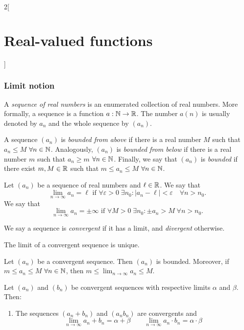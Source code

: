 \documentclass[../../../main.tex]{subfiles}
\begin{document}
\begin{multicols}{2}[\section{Real-valued functions}]
    \subsubsection*{Limit notion}
    \begin{definition}
        A \textit{sequence of real numbers} is an enumerated collection of real numbers. More formally, a sequence is a function $a:\mathbb{N}\rightarrow\mathbb{R}$. The number $a(n)$ is usually denoted by $a_n$ and the whole sequence by $(a_n)$.
    \end{definition}
    \begin{definition}
        A sequence $(a_n)$ is \textit{bounded from above} if there is a real number $M$ such that $a_n\leq M$ $\forall n\in\mathbb{N}$.
        Analogously, $(a_n)$ is \textit{bounded from below} if there is a real number $m$ such that $a_n\geq m$ $\forall n\in\mathbb{N}$.
        Finally, we say that $(a_n)$ is \textit{bounded} if there exist $m,M\in\mathbb{R}$ such that $m\leq a_n\leq M$ $\forall n\in\mathbb{N}$.
    \end{definition}
    \begin{definition}[Limit]
        Let $(a_n)$ be a sequence of real numbers and $\ell\in\mathbb{R}$. We say that $$\lim_{n\to\infty} a_n=\ell\text{ if }\forall\varepsilon>0\;\exists n_0:|a_n-\ell|<\varepsilon\quad\forall n>n_0.$$
        We say that $$\lim_{n\to\infty} a_n=\pm\infty\text{ if }\forall M>0\;\exists n_0:\pm a_n>M\;\forall n>n_0.$$
    \end{definition}
    \begin{definition}
        We say a sequence is \textit{convergent} if it has a limit, and \textit{divergent} otherwise.
    \end{definition}
    \begin{lemma}
        The limit of a convergent sequence is unique.
    \end{lemma}
    \begin{lemma}
        Let $(a_n)$ be a convergent sequence. Then $(a_n)$ is bounded. Moreover, if $m\leq a_n\leq M$ $\forall n\in\mathbb{N}$, then $\displaystyle m\leq \lim_{n\to\infty} a_n\leq M$.
    \end{lemma}
    \begin{lemma}
        Let $(a_n)$ and $(b_n)$ be convergent sequences with respective limits $\alpha$ and $\beta$. Then:
        \begin{enumerate}
            \item The sequences $(a_n+b_n)$ and $(a_nb_n)$ are convergents and $$\lim_{n\to\infty} a_n+b_n=\alpha+\beta\qquad\lim_{n\to\infty} a_n\cdot b_n=\alpha\cdot \beta$$

\end{enumerate}
\end{lemma}
\end{multicols}
\end{document}
